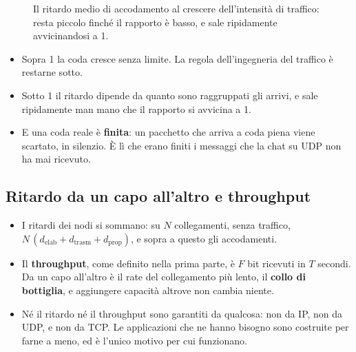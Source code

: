 \begin{figure}[H]
\centering
{}
\caption{Il ritardo medio di accodamento al crescere dell'intensità di traffico: resta piccolo finché il rapporto è basso, e
         sale ripidamente avvicinandosi a 1.}
\end{figure}


\begin{itemize}
    \item Sopra 1 la coda cresce senza limite. La regola dell'ingegneria del traffico è restarne sotto.
    \item Sotto 1 il ritardo dipende da quanto sono raggruppati gli arrivi, e sale ripidamente man mano che il rapporto si
          avvicina a 1.
    \item E una coda reale è \textbf{finita}: un pacchetto che arriva a coda piena viene scartato, in silenzio. È lì che
          erano finiti i messaggi che la chat su UDP non ha mai ricevuto.
\end{itemize}

\subsection{Ritardo da un capo all'altro e throughput}

\begin{itemize}
    \item I ritardi dei nodi si sommano: su $N$ collegamenti, senza traffico, $N\,(d_{\text{elab}} + d_{\text{trasm}} +
          d_{\text{prop}})$, e sopra a questo gli accodamenti.
    \item Il \textbf{throughput}, come definito nella prima parte, è $F$ bit ricevuti in $T$ secondi. Da un capo all'altro
          è il rate del collegamento più lento, il \textbf{collo di bottiglia}, e aggiungere capacità altrove non cambia
          niente.
    \item Né il ritardo né il throughput sono garantiti da qualcosa: non da IP, non da UDP, e non da TCP. Le applicazioni
          che ne hanno bisogno sono costruite per farne a meno, ed è l'unico motivo per cui funzionano.
\end{itemize}

